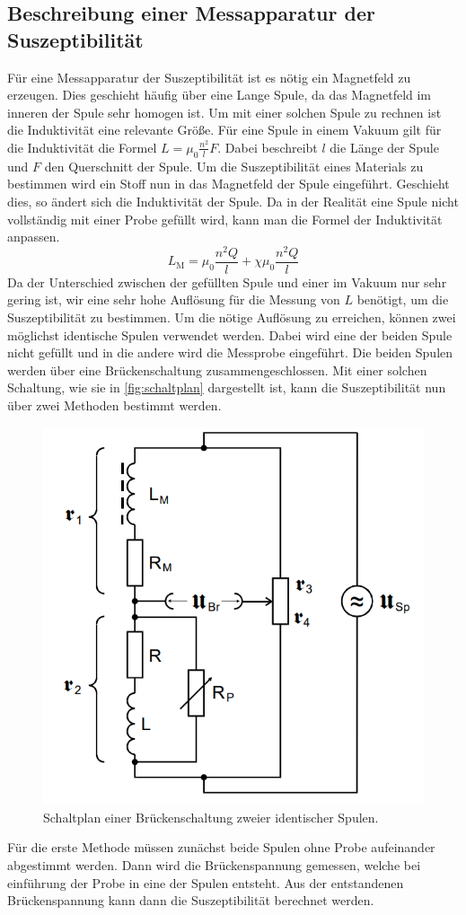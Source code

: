 \subsection{Beschreibung einer Messapparatur der Suszeptibilität}
\label{subsec:Messapparatur}
Für eine Messapparatur der Suszeptibilität ist es nötig ein Magnetfeld zu erzeugen. Dies geschieht häufig über eine Lange Spule, da das Magnetfeld im inneren der Spule sehr 
homogen ist. Um mit einer solchen Spule zu rechnen ist die Induktivität eine relevante Größe.
Für eine Spule in einem Vakuum gilt für die Induktivität die Formel $L = \mu_0 \frac{n^2}{l}F$. Dabei beschreibt $l$ die Länge der Spule und $F$ den Querschnitt der Spule.
Um die Suszeptibilität eines Materials zu bestimmen wird ein Stoff nun in das Magnetfeld der Spule eingeführt. Geschieht dies, so ändert sich die Induktivität der Spule. 
Da in der Realität eine Spule nicht vollständig mit einer Probe gefüllt wird, kann man die Formel der Induktivität anpassen.
\begin{equation}
    \label{eqn:L_M}
    L_{\text{M}} = \mu_0 \frac{n^2 Q}{l} + \chi \mu_0 \frac{n^2 Q}{l}
\end{equation} 
Da der Unterschied zwischen der gefüllten Spule und einer im Vakuum nur sehr gering ist, wir eine sehr hohe Auflösung für die Messung von $L$ benötigt,
um die Suszeptibilität zu bestimmen. Um die nötige Auflösung zu erreichen, können zwei möglichst identische Spulen verwendet werden. Dabei wird eine der beiden Spule nicht 
gefüllt und in die andere wird die Messprobe eingeführt. Die beiden Spulen werden über eine Brückenschaltung zusammengeschlossen. Mit einer solchen Schaltung, wie sie in
\autoref{fig:schaltplan} dargestellt ist, kann die Suszeptibilität nun über zwei Methoden bestimmt werden.
\begin{figure}
    \centering
    \includegraphics[width = .5\textwidth]{content/Schaltung1.PNG}
    \caption{Schaltplan einer Brückenschaltung zweier identischer Spulen. \cite{v606}}
    \label{fig:schaltplan}
\end{figure} 
Für die erste Methode müssen zunächst beide Spulen ohne Probe aufeinander abgestimmt werden. Dann wird die Brückenspannung gemessen, welche bei einführung der Probe in eine der 
Spulen entsteht. Aus der entstandenen Brückenspannung kann dann die Suszeptibilität berechnet werden.

